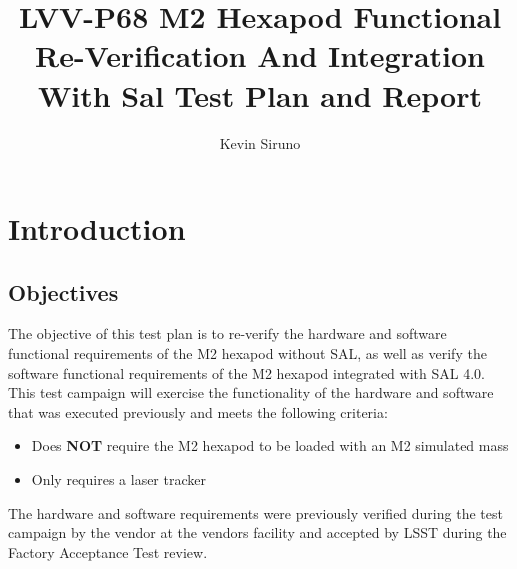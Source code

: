 \documentclass[SE,lsstdraft,STR,toc]{lsstdoc}
\providecommand{\tightlist}{
  \setlength{\itemsep}{0pt}\setlength{\parskip}{0pt}}
\begin{document}
\def\milestoneName{M2 Hexapod Functional Re-Verification And Integration With Sal}
\def\milestoneId{LVV-P68}
\def\product{SIT-COM Integration}


\title{ LVV-P68 M2 Hexapod Functional Re-Verification And Integration With Sal Test Plan and Report}
\setDocRef{\lsstDocType-\lsstDocNum}
\date{\vcsdate}
\author{ Kevin Siruno }






\maketitle

\section{Introduction}
\label{sect:intro}


\subsection{Objectives}
\label{sect:objectives}

 The objective of this test plan is to re-verify the hardware and
software functional requirements of the M2 hexapod without SAL, as well
as verify the software functional requirements of the M2 hexapod
integrated with SAL 4.0. This test campaign will exercise the
functionality of the hardware and software that was executed previously
and meets the following criteria:

\begin{itemize}
\tightlist
\item
  Does \textbf{NOT} require the M2 hexapod to be loaded with an M2
  simulated mass
\item
  Only requires a laser tracker
\end{itemize}

The hardware and software requirements were previously verified during
the test campaign by the vendor at the vendors facility and accepted by
LSST during the Factory Acceptance Test review.
\end{document}
